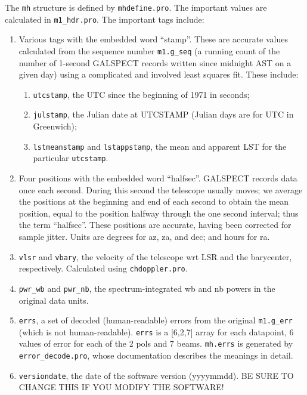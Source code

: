 \documentclass[psfig,preprint]{aastex}
\begin{document}
	The \verb$mh$ structure is defined by \verb$mhdefine.pro$. The
important values are calculated in \verb$m1_hdr.pro$. The important
tags include: \begin{enumerate}

\item Various tags with the embedded word ``stamp''. These are accurate
values calculated from the sequence number \verb$m1.g_seq$ (a running
count of the number of 1-second GALSPECT records written since midnight
AST on a given day) using a complicated and involved least squares fit.
These include: \begin{enumerate}

	\item \verb$utcstamp$, the UTC since the beginning of 1971 in
seconds; 

	\item \verb$julstamp$, the Julian date at UTCSTAMP (Julian days
are for UTC in Greenwich); 

	\item \verb$lstmeanstamp$ and \verb$lstappstamp$, the mean and
apparent LST for the particular \verb$utcstamp$. \end{enumerate}

\item Four positions with the embedded word ``halfsec''. GALSPECT
records data once each second. During this second the telescope usually
moves; we average the positions at the beginning and end of each second
to obtain the mean position, equal to the position halfway through the
one second interval; thus the term ``halfsec''.  These positions are
accurate, having been corrected for sample jitter. Units are degrees for
az, za, and dec; and hours for ra.

\item \verb$vlsr$ and \verb$vbary$, the velocity of the telescope wrt LSR
and the barycenter, respectively. Calculated using \verb$chdoppler.pro$.
	
\item \verb$pwr_wb$ and \verb$pwr_nb$, the spectrum-integrated wb and nb
powers in the original data units.

\item \verb$errs$, a set of decoded (human-readable) errors from the
original \verb$m1.g_err$ (which is not human-readable). \verb$errs$ is a
[6,2,7] array for each datapoint, 6 values of error for each of the 2
pols and 7 beams. \verb$mh.errs$ is generated by
\verb$error_decode.pro$, whose documentation describes the meanings in
detail. 

\item \verb$versiondate$, the date of the software version (yyyymmdd). 
BE SURE TO CHANGE THIS IF YOU MODIFY THE SOFTWARE! \end{enumerate}
\end{document}
